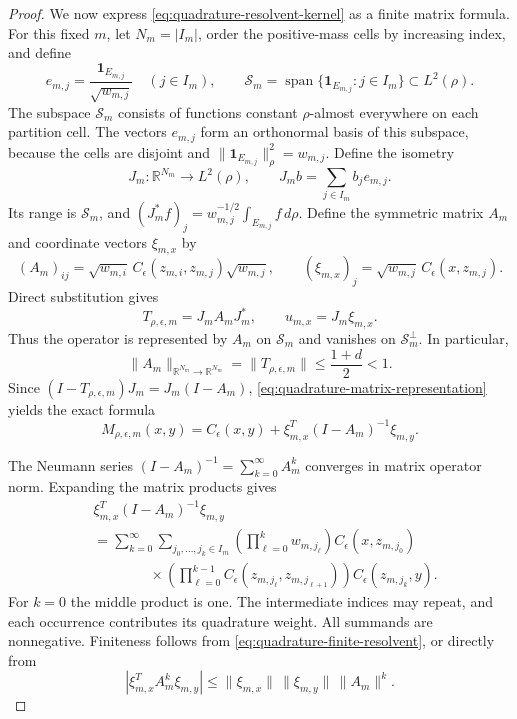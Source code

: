 \begin{proof}
We now express \cref{eq:quadrature-resolvent-kernel} as a finite
matrix formula. For this fixed $m$, let $N_m=|I_m|$, order the
positive-mass cells by increasing index, and define
\[
 e_{m,j}=\frac{\mathbf1_{E_{m,j}}}{\sqrt{w_{m,j}}}\quad(j\in I_m),
 \qquad
 \mathcal S_m=\operatorname{span}\{\mathbf1_{E_{m,j}}:j\in I_m\}
 \subset L^2(\rho).
\]
The subspace $\mathcal S_m$ consists of functions constant
$\rho$-almost everywhere on each partition cell. The vectors
$e_{m,j}$ form an orthonormal basis of this subspace, because
the cells are disjoint and $\|\mathbf1_{E_{m,j}}\|_\rho^2=w_{m,j}$.
Define the isometry
\[
 J_m:\mathbb R^{N_m}\to L^2(\rho),\qquad
 J_m b=\sum_{j\in I_m}b_j e_{m,j}.
\]
Its range is $\mathcal S_m$, and
$(J_m^*f)_j=w_{m,j}^{-1/2}\int_{E_{m,j}}f\,d\rho$.
Define the symmetric matrix $A_m$ and coordinate vectors
$\xi_{m,x}$ by
\[
 (A_m)_{ij}=\sqrt{w_{m,i}}\,
       C_\epsilon(z_{m,i},z_{m,j})\sqrt{w_{m,j}},
 \qquad
 (\xi_{m,x})_j=\sqrt{w_{m,j}}\,C_\epsilon(x,z_{m,j}).
\]
Direct substitution gives
\begin{equation}\label{eq:quadrature-matrix-representation}
 T_{\rho,\epsilon,m}=J_m A_m J_m^*,\qquad
 u_{m,x}=J_m\xi_{m,x}.
\end{equation}
Thus the operator is represented by $A_m$ on $\mathcal S_m$
and vanishes on $\mathcal S_m^\perp$. In particular,
\[
 \|A_m\|_{\mathbb R^{N_m}\to\mathbb R^{N_m}}
 =\|T_{\rho,\epsilon,m}\|\le\frac{1+d}{2}<1.
\]
Since $(I-T_{\rho,\epsilon,m})J_m=J_m(I-A_m)$,
\cref{eq:quadrature-matrix-representation} yields the exact formula
\begin{equation}\label{eq:quadrature-finite-resolvent}
 M_{\rho,\epsilon,m}(x,y)
 =C_\epsilon(x,y)+\xi_{m,x}^T(I-A_m)^{-1}\xi_{m,y}.
\end{equation}

The Neumann series $(I-A_m)^{-1}=\sum_{k=0}^\infty A_m^k$
converges in matrix operator norm. Expanding the matrix products gives
\begin{equation}\label{eq:quadrature-product-expansion}
 \begin{aligned}
 &\xi_{m,x}^T(I-A_m)^{-1}\xi_{m,y}\\
 &=\sum_{k=0}^\infty\sum_{j_0,\ldots,j_k\in I_m}
   \left(\prod_{\ell=0}^k w_{m,j_\ell}\right)
   C_\epsilon(x,z_{m,j_0})\\
 &\qquad\qquad{}\times\left(\prod_{\ell=0}^{k-1}
     C_\epsilon(z_{m,j_\ell},z_{m,j_{\ell+1}})\right)
   C_\epsilon(z_{m,j_k},y).
 \end{aligned}
\end{equation}
For $k=0$ the middle product is one. The intermediate indices may
repeat, and each occurrence contributes its quadrature weight.
All summands are nonnegative. Finiteness follows from
\eqref{eq:quadrature-finite-resolvent}, or directly from
\[
 |\xi_{m,x}^T A_m^k\xi_{m,y}|
 \le\|\xi_{m,x}\|\,\|\xi_{m,y}\|\,\|A_m\|^k.
\]


\end{proof}

